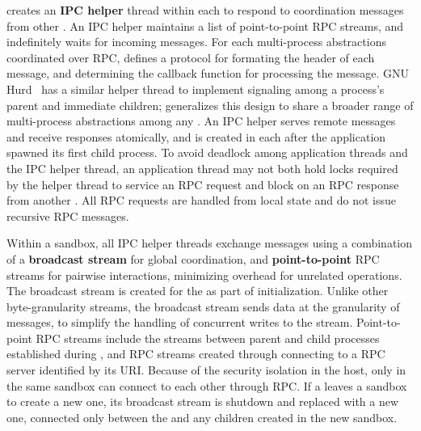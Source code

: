 \thelibos{} creates an {\bf IPC helper} thread within each \picoproc{}
to respond to coordination messages from other \picoprocs{}. 
An IPC helper
maintains a list of point-to-point RPC streams, and indefinitely waits for incoming messages.
For each multi-process abstractions coordinated over RPC,
\thelibos{} defines a protocol for formating the header of each message,
and determining the callback function for processing the message.
GNU Hurd~\cite{hurd} has a similar helper thread to implement signaling among a process's parent and
immediate children;
\graphene{} generalizes this design to share a broader range of multi-process abstractions among any \picoprocs{}.
An IPC helper serves remote messages and receive responses atomically,
and is created in each \picoproc{}
after the application spawned its first child process.
To avoid deadlock among application threads and the IPC helper thread, 
an application thread may not both hold locks required by the helper thread to service an RPC request
and block on an RPC response from another \picoproc{}.
All RPC requests are handled from local state and do not issue recursive RPC messages.%

Within a sandbox, all IPC helper threads exchange messages using a
combination of
a {\bf broadcast stream} for global coordination,
and {\bf point-to-point} RPC streams for pairwise interactions, 
minimizing overhead for unrelated operations.
The broadcast stream is created for the \picoproc{} as part of initialization.
Unlike other byte-granularity streams, the broadcast stream sends data at the granularity of messages,
to simplify the handling of concurrent writes to the stream.
Point-to-point RPC streams include the streams between parent and child processes established during ,
and RPC streams created through connecting to a RPC server
identified by its URI.
Because of the security isolation in the host,
only \picoprocs{} in the same sandbox can connect to each other through RPC.
If a \picoproc{} leaves a sandbox to create a new one,
its broadcast stream is shutdown and replaced
with a new one, connected only between the \picoproc{} and any children created in the
new sandbox.

